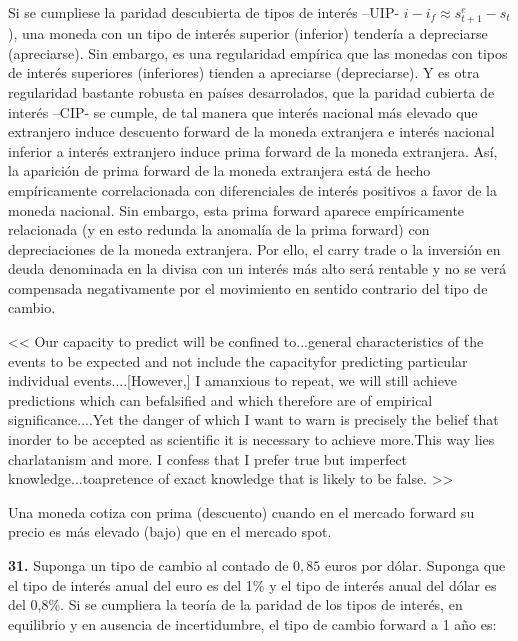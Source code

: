 \documentclass{nuevotema}
\begin{document}
\conceptos


Si se cumpliese la paridad descubierta de tipos de interés --UIP- $i - i_f \approx s^e_{t+1} - s_t$), una moneda con un tipo de interés superior (inferior) tendería a depreciarse (apreciarse). Sin embargo, es una regularidad empírica que las monedas con tipos de interés superiores (inferiores) tienden a apreciarse (depreciarse). Y es otra regularidad bastante robusta en países desarrolados, que la paridad cubierta de interés --CIP- se cumple, de tal manera que interés nacional más elevado que extranjero induce descuento forward de la moneda extranjera e interés nacional inferior a interés extranjero induce prima forward de la moneda extranjera. Así, la aparición de prima forward de la moneda extranjera está de hecho empíricamente correlacionada con diferenciales de interés positivos a favor de la moneda nacional. Sin embargo, esta prima forward aparece empíricamente relacionada (y en esto redunda la anomalía de la prima forward) con depreciaciones de la moneda extranjera. Por ello, el carry trade o la inversión en deuda denominada en la divisa con un interés más alto será rentable y no se verá compensada negativamente por el movimiento en sentido contrario del tipo de cambio.


<< Our capacity to predict will be confined to...general characteristics of the events to be expected and not include the capacityfor predicting particular individual events....[However,] I amanxious to repeat, we will still achieve predictions which can befalsified and which therefore are of empirical significance....Yet the danger of which I want to warn is precisely the belief that inorder to be accepted as scientific it is necessary to achieve more.This way lies charlatanism and more. I confess that I prefer true but imperfect knowledge...toapretence of exact knowledge that is likely to be false. >>


Una moneda cotiza con prima (descuento) cuando en el mercado forward su precio es más elevado (bajo) que en el mercado spot.

\preguntas


\textbf{31.} Suponga un tipo de cambio al contado de $0,85$ euros por dólar. Suponga que el tipo de interés anual del euro es del 1\% y el tipo de interés anual del dólar es del 0,8\%. Si se cumpliera la teoría de la paridad de los tipos de interés, en equilibrio y en ausencia de incertidumbre, el tipo de cambio forward a 1 año es:
\end{document}
